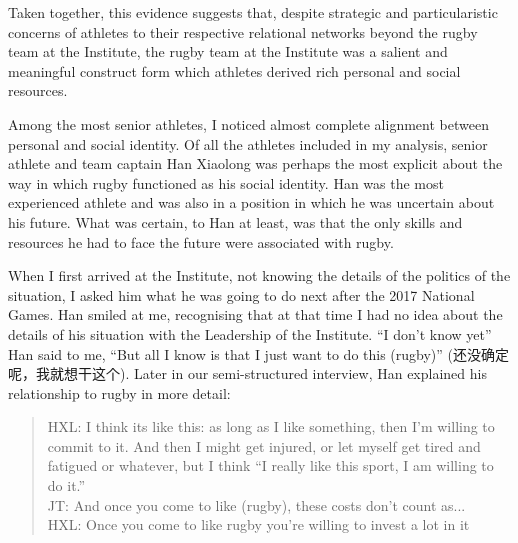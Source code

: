 \begin{CJK}{UTF8}{gbsn}
Taken together, this evidence suggests that, despite strategic and particularistic concerns of athletes to their respective relational networks beyond the rugby team at the Institute, the rugby team at the Institute was a salient and meaningful construct form which athletes derived rich personal and social resources.

Among the most senior athletes, I noticed almost complete alignment between personal and social identity.  Of all the athletes included in my analysis, senior athlete and team captain Han Xiaolong was perhaps the most explicit about the way in which rugby functioned as his social identity.  Han was the most experienced athlete and was also in a position in which he was uncertain about his future. What was certain, to Han at least, was that the only skills and resources he had to face the future were associated with rugby.

When I first arrived at the Institute, not knowing the details of the politics of the situation, I asked him what he was going to do next after the 2017 National Games.  Han smiled at me, recognising that at that time I had no idea about the details of his situation with the Leadership of the Institute. ``I don't know yet'' Han said to me, ``But all I know is that I just want to do this (rugby)'' (还没确定呢，我就想干这个).  Later in our semi-structured interview, Han explained his relationship to rugby in more detail:
          \begin{quote}
            HXL: I think its like this: as long as I like something, then I'm willing to commit to it.  And then I might get injured, or let myself get tired and fatigued or whatever, but I think ``I really like this sport, I am willing to do it.''\\
            JT: And once you come to like (rugby), these costs don't count as...\\
            HXL: Once you come to like rugby you're willing to invest a lot in it
          \end{quote}


\end{CJK}
